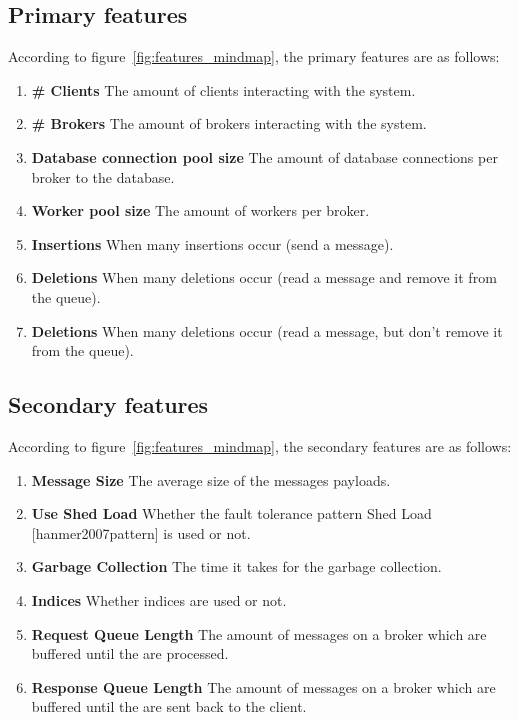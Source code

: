 \documentclass[a4paper]{article}
\begin{document}
\subsection{Primary features}

According to figure~\ref{fig:features_mindmap}, the primary features are as follows:

\begin{enumerate}
  \item \textbf{\# Clients} The amount of clients interacting with the system.
  \item \textbf{\# Brokers} The amount of brokers interacting with the system.
  \item \textbf{Database connection pool size} The amount of database connections per broker to the database.
  \item \textbf{Worker pool size} The amount of workers per broker.
  \item \textbf{Insertions} When many insertions occur (send a message).
  \item \textbf{Deletions} When many deletions occur (read a message and remove it from the queue).
  \item \textbf{Deletions} When many deletions occur (read a message, but don't remove it from the queue).
\end{enumerate}


\subsection{Secondary features}

According to figure~\ref{fig:features_mindmap}, the secondary features are as follows:

\begin{enumerate}
  \item \textbf{Message Size} The average size of the messages payloads.
  \item \textbf{Use Shed Load} Whether the fault tolerance pattern Shed Load [hanmer2007pattern] is used or not.
  \item \textbf{Garbage Collection} The time it takes for the garbage collection.
  \item \textbf{Indices} Whether indices are used or not.
  \item \textbf{Request Queue Length} The amount of messages on a broker which are buffered until the are processed.
    \item \textbf{Response Queue Length} The amount of messages on a broker which are buffered until the are sent back to the client.
\end{enumerate}
\end{document}
